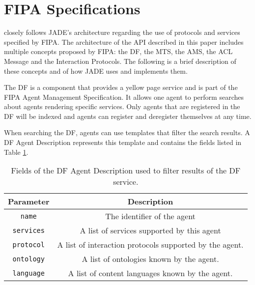 \section{FIPA Specifications} %
\label{sec:fipa}

\apiname{} closely follows JADE's architecture regarding the use of protocols and services specified by \gls{FIPA}. The architecture of the API described in this paper includes multiple concepts proposed by \gls{FIPA}: the \gls{DF}, the \gls{MTS}, the \gls{AMS}, the \gls{ACL} Message and the Interaction Protocols. The following is a brief description of these concepts and of how JADE uses and implements them.


The \gls{DF} is a component that provides a yellow page service and is part of the FIPA Agent Management Specification. It allows one agent to perform searches about agents rendering specific services. Only agents that are registered in the DF will be indexed and agents can register and deregister themselves at any time.

When searching the DF, agents can use templates that filter the search results. A DF Agent Description represents this template and contains the fields listed in Table \ref{tab:dfAgentDescription}.

\begin{table}
	\normalsize
	\caption{Fields of the DF Agent Description used to filter results of the DF service.}
	\label{tab:dfAgentDescription}
	\begin{center}
		\begin{tabular}{c|c}
		\hline
		\textbf{Parameter} & \textbf{Description} \\
		\hline
		\texttt{name} & The identifier of the agent \\
		\hline
		\texttt{services} & A list of services supported by this agent \\
		\hline
		\texttt{protocol} & A list of interaction protocols supported by the agent. \\
		\hline
		\texttt{ontology} & A list of ontologies known by the agent. \\
		\hline
		\texttt{language} & A list of content languages known by the agent. \\
		\hline
		\end{tabular}
	\end{center}
\end{table} 

